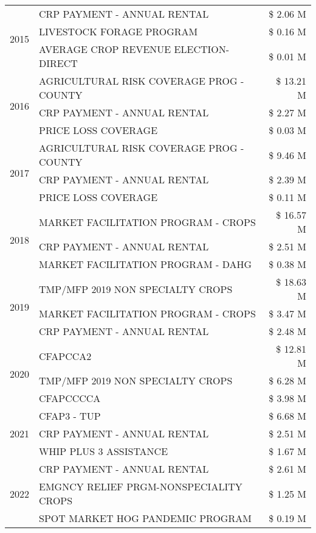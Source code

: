 \begin{tabular}{llr}
\cline{1-3}
\multirow[t]{3}{*}{2015} & CRP PAYMENT - ANNUAL RENTAL & \$ 2.06 M \\
 & LIVESTOCK FORAGE PROGRAM & \$ 0.16 M \\
 & AVERAGE CROP REVENUE ELECTION-DIRECT & \$ 0.01 M \\
\cline{1-3}
\multirow[t]{3}{*}{2016} & AGRICULTURAL RISK COVERAGE PROG - COUNTY & \$ 13.21 M \\
 & CRP PAYMENT - ANNUAL RENTAL & \$ 2.27 M \\
 & PRICE LOSS COVERAGE & \$ 0.03 M \\
\cline{1-3}
\multirow[t]{3}{*}{2017} & AGRICULTURAL RISK COVERAGE PROG - COUNTY & \$ 9.46 M \\
 & CRP PAYMENT - ANNUAL RENTAL & \$ 2.39 M \\
 & PRICE LOSS COVERAGE & \$ 0.11 M \\
\cline{1-3}
\multirow[t]{3}{*}{2018} & MARKET FACILITATION PROGRAM - CROPS & \$ 16.57 M \\
 & CRP PAYMENT - ANNUAL RENTAL & \$ 2.51 M \\
 & MARKET FACILITATION PROGRAM - DAHG & \$ 0.38 M \\
\cline{1-3}
\multirow[t]{3}{*}{2019} & TMP/MFP 2019 NON SPECIALTY CROPS & \$ 18.63 M \\
 & MARKET FACILITATION PROGRAM - CROPS & \$ 3.47 M \\
 & CRP PAYMENT - ANNUAL RENTAL & \$ 2.48 M \\
\cline{1-3}
\multirow[t]{3}{*}{2020} & CFAPCCA2 & \$ 12.81 M \\
 & TMP/MFP 2019 NON SPECIALTY CROPS & \$ 6.28 M \\
 & CFAPCCCCA & \$ 3.98 M \\
\cline{1-3}
\multirow[t]{3}{*}{2021} & CFAP3 - TUP & \$ 6.68 M \\
 & CRP PAYMENT - ANNUAL RENTAL & \$ 2.51 M \\
 & WHIP PLUS 3 ASSISTANCE & \$ 1.67 M \\
\cline{1-3}
\multirow[t]{3}{*}{2022} & CRP PAYMENT - ANNUAL RENTAL & \$ 2.61 M \\
 & EMGNCY RELIEF PRGM-NONSPECIALITY CROPS & \$ 1.25 M \\
 & SPOT MARKET HOG PANDEMIC PROGRAM & \$ 0.19 M \\
\cline{1-3}
\bottomrule
\end{tabular}
